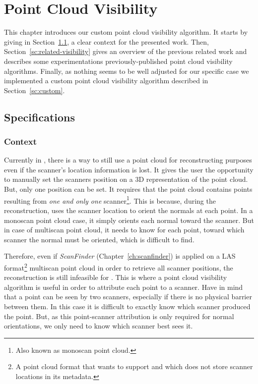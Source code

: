 \chapter{Point Cloud Visibility}
\label{ch:visibility}
This chapter introduces our custom point cloud visibility algorithm. It starts by giving in Section~\ref{sc:spec-visibility}, a clear context for the presented work. Then, Section~\ref{sc:related-visibility} gives an overview of the previous related work and describes some experimentations previously-published point cloud visibility algorithms. Finally, as nothing seems to be well adjusted for our specific case we implemented a custom point cloud visibility algorithm described in Section~\ref{sc:custom}.

\section{Specifications}
\label{sc:spec-visibility}

\subsection{Context}
Currently in \CC, there is a way to still use a point cloud for reconstructing purposes even if the scanner's location information is lost. It gives the user the opportunity to manually set the scanners position on a 3D representation of the point cloud. But, only one position can be set. It requires that the point cloud contains points resulting from \emph{one and only one} scanner\footnote{Also known as monoscan point cloud.}. This is because, during the reconstruction, \CC uses
the scanner location to orient the normals at each point. In a monoscan point cloud case, it simply orients each normal toward the scanner. But in case of multiscan point cloud, it needs to know for each point, toward which scanner the normal must be oriented, which is difficult to find.

Therefore, even if \emph{ScanFinder} (Chapter~\ref{ch:scanfinder}) is applied on a LAS format\footnote{A point cloud format that \CC wants to support and which does not store scanner locations in its metadata.} multiscan point cloud in order to retrieve all scanner positions, the reconstruction is still infeasible for \CC. This is where a point cloud visibility algorithm is useful in order to attribute each point to a scanner. Have in mind that a point can be seen by two scanners, especially if there is no physical barrier between them. In this case it is difficult to exactly know which scanner produced the point. But, as this point-scanner attribution is only required for normal orientations, we only need to know which scanner best sees it.

